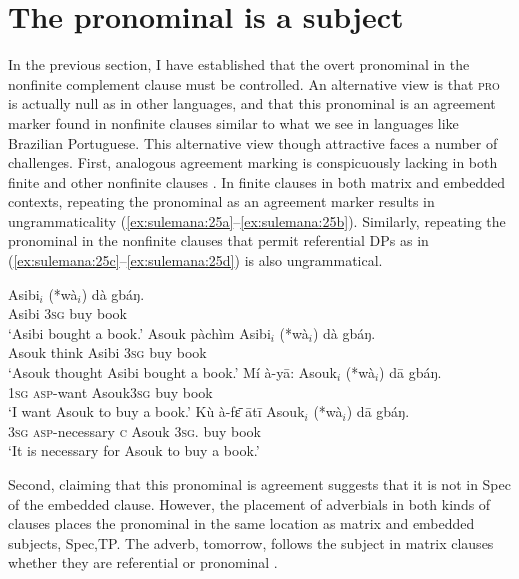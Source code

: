 \documentclass[output=paper,colorlinks,citecolor=brown]{langscibook}
\begin{document}
\section{The pronominal is a subject}\label{sec:sulemana:5}

In the previous section, I have established that the overt pronominal in the nonfinite complement clause must be controlled. An alternative view is that \textsc{pro} is actually null as in other languages, and that this pronominal is an agreement marker found in nonfinite clauses similar to what we see in languages like Brazilian Portuguese. This alternative view though attractive faces a number of challenges.
First, analogous agreement marking is conspicuously lacking in both finite and other nonfinite clauses . In finite clauses in both matrix and embedded contexts, repeating the pronominal as an agreement marker results in ungrammaticality (\ref{ex:sulemana:25a}--\ref{ex:sulemana:25b}). 
Similarly, repeating the pronominal in the nonfinite clauses that permit referential DPs as in (\ref{ex:sulemana:25c}--\ref{ex:sulemana:25d}) is also ungrammatical. 

\ea%
    \label{ex:sulemana:25}
    \ea%
    \label{ex:sulemana:25a}
    \gll    Asibi$_i$  (*wà$_i$) dà gbáŋ. \\
            Asibi  \textsc{3sg} buy book\\
    \glt    `Asibi bought a book.'
    \ex%
    \label{ex:sulemana:25b}
    \gll    Asouk pàchìm Asibi$_i$ (*wà$_i$) dà gbáŋ. \\
            Asouk think Asibi   \textsc{3sg} buy book\\
    \glt    `Asouk thought Asibi bought a book.'
    \ex%
    \label{ex:sulemana:25c}
    \gll    Mí à-yā: Asouk$_i$ (*wà$_i$) dā gbáŋ. \\
            \textsc{1sg} \textsc{asp}-want Asouk\textsc{3sg} buy book\\
    \glt    `I want Asouk to buy a book.'
    \ex%
    \label{ex:sulemana:25d}
    \gll    Kù à-fɛ̄ ātī Asouk$_i$ (*wà$_i$) dā gbáŋ. \\
            \textsc{3sg} \textsc{asp}-necessary \textsc{c} Asouk \textsc{3sg}. buy book\\
    \glt    `It is necessary for Asouk to buy a book.' 
    \z
\z

Second, claiming that this pronominal is agreement suggests that it is not in Spec of the embedded clause. However, the placement of adverbials in both kinds of clauses places the pronominal in the same location as matrix and embedded subjects, Spec,TP. The adverb, tomorrow, follows the subject in matrix clauses whether they are referential  or pronominal . 
\end{document}
